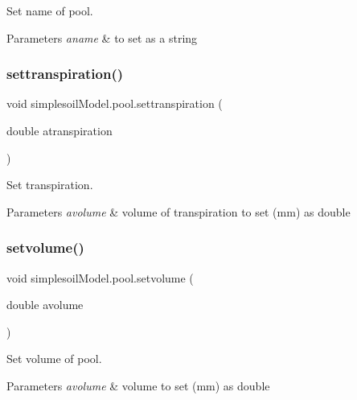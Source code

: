 Set name of pool. 


\begin{DoxyParams}{Parameters}
{\em aname} & to set as a string \\
\hline
\end{DoxyParams}
\mbox{\label{classsimplesoil_model_1_1pool_ac816508405bffebca3d5c475935d642f}} 
\subsubsection{\texorpdfstring{settranspiration()}{settranspiration()}}
{\footnotesize\ttfamily void simplesoil\+Model.\+pool.\+settranspiration (\begin{DoxyParamCaption}\item[{double}]{atranspiration }\end{DoxyParamCaption})\hspace{0.3cm}{\ttfamily [inline]}}



Set transpiration. 


\begin{DoxyParams}{Parameters}
{\em avolume} & volume of transpiration to set (mm) as double \\
\hline
\end{DoxyParams}
\mbox{\label{classsimplesoil_model_1_1pool_a2459746f840a3d2a6de1748cd430aafc}} 
\subsubsection{\texorpdfstring{setvolume()}{setvolume()}}
{\footnotesize\ttfamily void simplesoil\+Model.\+pool.\+setvolume (\begin{DoxyParamCaption}\item[{double}]{avolume }\end{DoxyParamCaption})\hspace{0.3cm}{\ttfamily [inline]}}



Set volume of pool. 


\begin{DoxyParams}{Parameters}
{\em avolume} & volume to set (mm) as double \\
\hline
\end{DoxyParams}
\mbox{\label{classsimplesoil_model_1_1pool_a5b7b5a3ce11f8db111e79c4726552001}} 
